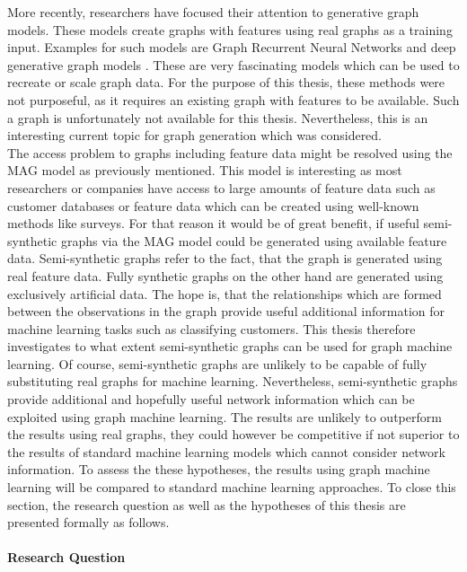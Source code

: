 	\noindent More recently, researchers have focused their attention to
	generative graph models. These models create graphs with features using
	real graphs as a training input. Examples for such models are Graph
	Recurrent Neural Networks \citep{you2018graphrnn} and deep generative graph
	models \citep{li2018learning}. These are very fascinating models which can
	be used to recreate or scale graph data. For the purpose of this thesis,
	these methods were not purposeful, as it requires an existing graph with
	features to be available. Such a graph is unfortunately not available for
	this thesis. Nevertheless, this is an interesting current topic for graph 
	generation which was considered. \\ 

	\noindent The access problem to graphs including feature data might be resolved
	using the MAG model as previously mentioned. This model is interesting as 
	most researchers or companies have access to large amounts of feature data 
	such as customer databases or feature data which can be created using 
	well-known methods like surveys. For that reason it would be of great
	benefit, if useful semi-synthetic graphs via the MAG model could be
	generated using available feature data. Semi-synthetic graphs refer to the 
	fact, that the graph is generated using real feature data. Fully synthetic 
	graphs on the other hand are generated using exclusively artificial data. 
	The hope is, that the relationships which are formed between the 
	observations in the graph provide useful additional information for machine 
	learning tasks such as classifying customers. This thesis therefore
	investigates to what extent semi-synthetic graphs can be used for graph
	machine learning. Of course, semi-synthetic graphs are unlikely to be
	capable of fully substituting real graphs for machine learning.
	Nevertheless, semi-synthetic graphs provide additional and hopefully useful
	network information which can be exploited using graph machine learning.
	The results are unlikely to outperform the results using real graphs, they
	could however be competitive if not superior to the results of standard 
	machine learning models which cannot consider network information. To assess 
	the these hypotheses, the results using graph machine learning will be 
	compared to standard machine learning approaches. To close this section, 
	the research question as well as the hypotheses of this thesis are 
	presented formally as follows. 

	\paragraph{Research Question}\mbox{}

